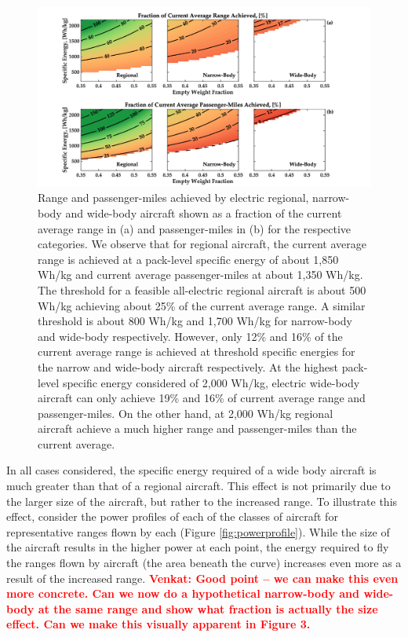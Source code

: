 \documentclass{achemso}
\newcommand{\vv}[1]{{\textbf{\textcolor{red}{Venkat: #1}}}}
\begin{document}
\begin{figure}[h]
\centering
\includegraphics[width=\textwidth]{Figures/contours.png}\hfill
\caption{Range and passenger-miles achieved by electric regional, narrow-body and wide-body aircraft shown as a fraction of the current average range in (a) and passenger-miles in (b) for the respective categories. We observe that for regional aircraft, the current average range is achieved at a pack-level specific energy of about 1,850 Wh/kg and current average passenger-miles at about 1,350 Wh/kg. The threshold for a feasible all-electric regional aircraft is about 500 Wh/kg achieving about 25\% of the current average range. A similar threshold is about 800 Wh/kg and 1,700 Wh/kg for narrow-body and wide-body respectively. However, only 12\% and 16\% of the current average range is achieved at threshold specific energies for the narrow and wide-body aircraft respectively. At the highest pack-level specific energy considered of 2,000 Wh/kg, electric wide-body aircraft can only achieve 19\% and 16\% of current average range and passenger-miles. On the other hand, at 2,000 Wh/kg regional aircraft achieve a much higher range and passenger-miles than the current average.}
\label{fig:contours}
\end{figure}


In all cases considered, the specific energy required of a wide body aircraft is much greater than that of a regional aircraft. This effect is not primarily due to the larger size of the aircraft, but rather to the increased range. To illustrate this effect, consider the power profiles of each of the classes of aircraft for representative ranges flown by each (Figure \ref{fig:powerprofile}). While the size of the aircraft results in the higher power at each point, the energy required to fly the ranges flown by aircraft (the area beneath the curve) increases even more as a result of the increased range. \vv{Good point -- we can make this even more concrete.  Can we now do a hypothetical narrow-body and wide-body at the same range and show what fraction is actually the size effect.  Can we make this visually apparent in Figure 3.}
\end{document}

